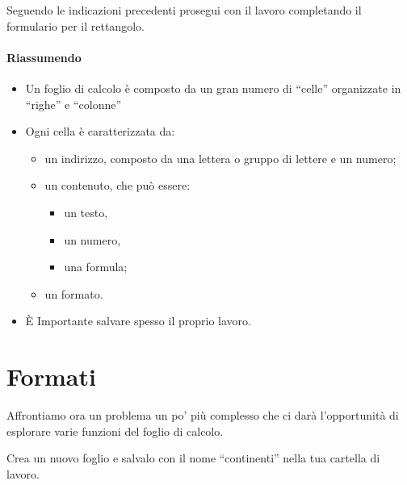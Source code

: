 \begin{esempio}
Seguendo le indicazioni precedenti prosegui con il lavoro completando il 
formulario per il rettangolo.
\end{esempio}

\paragraph{Riassumendo}

\begin{itemize} [nosep]
\item 
Un foglio di calcolo è composto da un gran numero di ``celle'' organizzate
in ``righe'' e ``colonne''
\item 
Ogni cella è caratterizzata da:
\begin{itemize} [nosep]
\item un indirizzo, composto da una lettera o gruppo di lettere e un numero;
\item un contenuto, che può essere:
  \begin{itemize}
  \item un testo,
  \item un numero,
  \item una formula;
\end{itemize}
\item un formato.
\end{itemize}
\item È Importante salvare spesso il proprio lavoro.
\end{itemize}

\section{Formati}
\label{fogliodicalcolo:formati}

\vspace{1em}

Affrontiamo ora un problema un po' più complesso che ci darà l'opportunità di 
esplorare varie funzioni del foglio di calcolo.

Crea un nuovo foglio e salvalo con il nome ``continenti'' nella tua cartella 
di lavoro.
\vspace{.5em}

